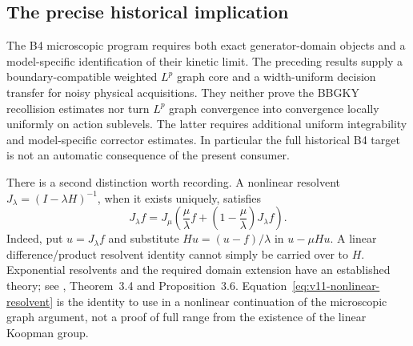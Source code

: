 \subsection{The precise historical implication}
The B4 microscopic program requires both exact generator-domain objects
and a model-specific identification of their kinetic limit. The preceding
results supply a boundary-compatible weighted $L^p$ graph core and a
width-uniform decision transfer for noisy physical acquisitions. They
neither prove the BBGKY recollision estimates nor turn $L^p$ graph
convergence into convergence locally uniformly on action sublevels.
The latter requires additional uniform integrability and model-specific
corrector estimates. In particular the full historical B4 target is not
an automatic consequence of the present consumer.

There is a second distinction worth recording. A nonlinear resolvent
$J_\lambda=(I-\lambda H)^{-1}$, when it exists uniquely, satisfies
\begin{equation}
 J_\lambda f=
 J_\mu\left(\frac\mu\lambda f+
                  \left(1-\frac\mu\lambda\right)J_\lambda f\right).
 \label{eq:v11-nonlinear-resolvent}
\end{equation}
Indeed, put $u=J_\lambda f$ and substitute $Hu=(u-f)/\lambda$ in
$u-\mu Hu$. A linear difference/product resolvent identity cannot simply
be carried over to $H$. Exponential resolvents and the required domain
extension have an established theory; see \cite{Kraaij2019}, Theorem~3.4
and Proposition~3.6. Equation~\eqref{eq:v11-nonlinear-resolvent} is the
identity to use in a nonlinear continuation of the microscopic graph
argument, not a proof of full range from the existence of the linear
Koopman group.

